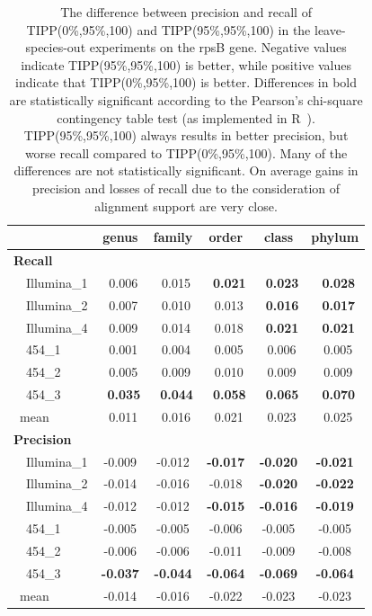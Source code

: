 \begin{table}[hptb]
\caption[Precision-Recall Differences between TIPP(0\%,95\%,100) and TIPP(95\%,95\%,100) on the rpsB gene]{\label{tipp:difference.leaveout.rspb.sepp95.tipp}
The difference between precision and recall of TIPP(0\%,95\%,100) and TIPP(95\%,95\%,100) in the leave-species-out experiments on the rpsB gene. 
Negative values indicate TIPP(95\%,95\%,100) is better, while positive values indicate that TIPP(0\%,95\%,100) is better.
Differences in bold are statistically significant according to the Pearson's chi-square contingency table test (as implemented in R~\cite{R}). 
TIPP(95\%,95\%,100) always results in better precision, but worse recall compared to TIPP(0\%,95\%,100). 
Many of the differences are not statistically significant.
On average gains in precision and losses of recall due to the consideration of alignment support are very close.  }
\begin{center}
\begin{tabular}{|l||c|c|c|c|c|} \hline
\multicolumn{1}{|l||}{}&\multicolumn{1}{c|}{genus}&\multicolumn{1}{c|}{family}&\multicolumn{1}{c|}{order}&\multicolumn{1}{c|}{class}&\multicolumn{1}{c|}{phylum}\\ \hline
{\bf Recall}&&&&&\\
~~Illumina\_1&~0.006&~0.015&{\bf ~0.021}&{\bf ~0.023}&{\bf ~0.028}\\ 
~~Illumina\_2&~0.007&~0.010&~0.013&{\bf ~0.016}&{\bf ~0.017}\\ 
~~Illumina\_4&~0.009&~0.014&~0.018&{\bf ~0.021}&{\bf ~0.021}\\ 
~~454\_1&~0.001&~0.004&~0.005&~0.006&~0.005\\ 
~~454\_2&~0.005&~0.009&~0.010&~0.009&~0.009\\ 
~~454\_3&{\bf ~0.035}&{\bf ~0.044}&{\bf ~0.058}&{\bf ~0.065}&{\bf ~0.070}\\ 
~mean&~0.011&~0.016&~0.021&~0.023&~0.025\\ 
\hline
{\bf Precision}&&&&&\\
~~Illumina\_1&-0.009&-0.012&{\bf -0.017}&{\bf -0.020}&{\bf -0.021}\\ 
~~Illumina\_2&-0.014&-0.016&-0.018&{\bf -0.020}&{\bf -0.022}\\ 
~~Illumina\_4&-0.012&-0.012&{\bf -0.015}&{\bf -0.016}&{\bf -0.019}\\ 
~~454\_1&-0.005&-0.005&-0.006&-0.005&-0.005\\ 
~~454\_2&-0.006&-0.006&-0.011&-0.009&-0.008\\ 
~~454\_3&{\bf -0.037}&{\bf -0.044}&{\bf -0.064}&{\bf -0.069}&{\bf -0.064}\\ 
~mean&-0.014&-0.016&-0.022&-0.023&-0.023\\ 
\hline
\end{tabular}
\end{center}
\end{table}



